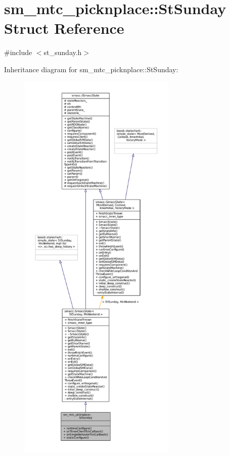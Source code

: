 \hypertarget{structsm__mtc__picknplace_1_1StSunday}{}\section{sm\+\_\+mtc\+\_\+picknplace\+:\+:St\+Sunday Struct Reference}
\label{structsm__mtc__picknplace_1_1StSunday}


{\ttfamily \#include $<$st\+\_\+sunday.\+h$>$}



Inheritance diagram for sm\+\_\+mtc\+\_\+picknplace\+:\+:St\+Sunday\+:
\nopagebreak
\begin{figure}[H]
\begin{center}
\leavevmode
\includegraphics[height=550pt]{structsm__mtc__picknplace_1_1StSunday__inherit__graph}
\end{center}
\end{figure}


